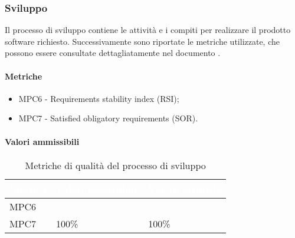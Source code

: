 \subsubsection{Sviluppo}
Il processo di sviluppo contiene le attività e i compiti per realizzare il prodotto software richiesto. Successivamente sono riportate le metriche utilizzate, che possono essere consultate dettagliatamente nel documento .

\paragraph{Metriche}
\begin{itemize}
	\item MPC6 - Requirements stability index (RSI);
	\item MPC7 - Satisfied obligatory requirements (SOR).
\end{itemize}


\paragraph{Valori ammissibili}
{
\renewcommand{\arraystretch}{1.5}
\centering
\begin{longtable}{C{2.5cm} C{4cm} C{4cm}}
\textcolor{white}{\textbf{Metrica}}&
\textcolor{white}{\textbf{Valori accettabile}}&
\textcolor{white}{\textbf{Valore ottimale}}\\	
\endhead
\endfoot
{}\caption{Metriche di qualità del processo di sviluppo}
\endlastfoot

MPC6 &   &  \\
MPC7 & 100\% & 100\%
\end{longtable}
}

